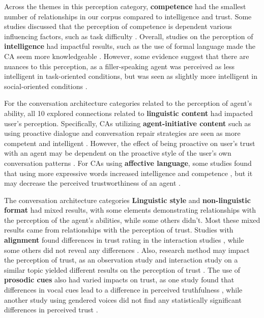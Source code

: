 \documentclass[sigconf,screen,review, anonymous]{acmart}
\newcommand{\cmt}[1]{}%
\begin{document}
Across the themes in this perception category, \textbf{competence} had the smallest number of relationships in our corpus compared to intelligence and trust. Some studies discussed that the perception of competence is dependent various influencing factors, such as task difficulty \cite{kraus2020effects}\cmt{[64]}. Overall, studies on the perception of \textbf{intelligence} had impactful results, such as the use of formal language made the CA seem more knowledgeable \cite{volkel2022user}\cmt{[75]}. However, some evidence suggest that there are nuances to this perception, as a filler-speaking agent was perceived as less intelligent in task-oriented conditions, but was seen as slightly more intelligent in social-oriented conditions \cite{jeong2019exploring}\cmt{[10]}.

For the conversation architecture categories related to the perception of agent's ability, all 10 explored connections related to \textbf{linguistic content} had impacted user's perception. Specifically, CAs utilizing \textbf{agent-initiative content} such as using proactive dialogue and conversation repair strategies are seen as more competent \cite{kraus2020effects}\cmt{[64]} and intelligent \cite{ashktorab2019resilient}\cmt{[88]}. However, the effect of being proactive on user's trust with an agent may be dependent on the proactive style of the user's own conversation patterns \cite{kraus2020effects}\cmt{[64]}. For CAs using \textbf{affective language}, some studies found that using more expressive words increased intelligence and competence \cite{lee2019s}\cmt{[55]}\cite{yang2017perceived}\cmt{[44]}, but it may decrease the perceived trustworthiness of an agent 
\cite{healey2013relating}\cmt{[39]}.

The conversation architecture categories \textbf{Linguistic style} and \textbf{non-linguistic format} had mixed results, with some elements demonstrating relationships with the perception of the agent's abilities, while some others didn't. Most these mixed results came from relationships with the perception of trust. Studies with \textbf{alignment} found differences in trust rating in the interaction studies \cite{hoegen2019end}\cmt{[31]}, while some others did not reveal any differences \cite{huiyang2022improving}\cmt{[17]}. Also, research method may impact the perception of trust, as an observation study and interaction study on a similar topic yielded different results on the perception of trust \cite{linnemann2018can}\cmt{[15]}. The use of \textbf{prosodic cues} also had varied impacts on trust, as one study found that differences in vocal cues lead to a difference in perceived truthfulness \cite{dubiel2020persuasive}\cmt{[60]}, while another study using gendered voices did not find any statistically significant differences in perceived trust \cite{jestin2022effects}\cmt{[81]}.
\end{document}
